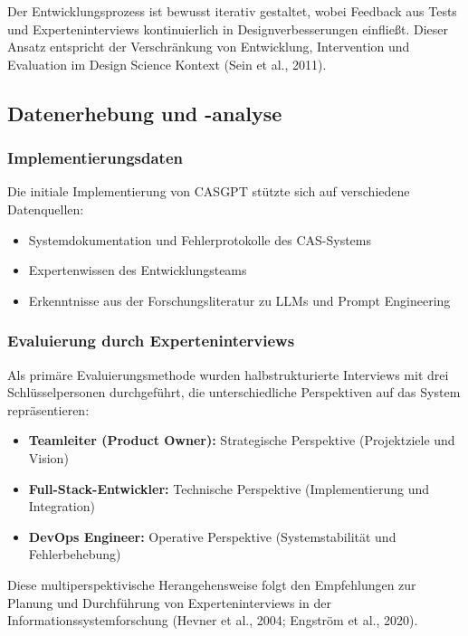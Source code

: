 \documentclass[
  a4paper,
  12pt,
  oneside,
  open=any,
  BCOR=12mm,
  DIV=14,
  parskip=half*,
  headsepline,
  footsepline,
  pointlessnumbers,
  liststotoc,
  numbers=noenddot,
  listof=totoc]{scrartcl}
\providecommand{\tightlist}{%
  \setlength{\itemsep}{0pt}\setlength{\parskip}{0pt}}\usepackage{longtable,booktabs,array}
\begin{document}
Der Entwicklungsprozess ist bewusst iterativ gestaltet, wobei Feedback
aus Tests und Experteninterviews kontinuierlich in Designverbesserungen
einfließt. Dieser Ansatz entspricht der Verschränkung von Entwicklung,
Intervention und Evaluation im Design Science Kontext (Sein et al.,
2011).

\subsection{Datenerhebung und
-analyse}\label{datenerhebung-und--analyse}

\subsubsection{Implementierungsdaten}\label{implementierungsdaten}

Die initiale Implementierung von CASGPT stützte sich auf verschiedene
Datenquellen:

\begin{itemize}
\tightlist
\item
  Systemdokumentation und Fehlerprotokolle des CAS-Systems
\item
  Expertenwissen des Entwicklungsteams
\item
  Erkenntnisse aus der Forschungsliteratur zu LLMs und Prompt
  Engineering
\end{itemize}

\subsubsection{Evaluierung durch
Experteninterviews}\label{evaluierung-durch-experteninterviews}

Als primäre Evaluierungsmethode wurden halbstrukturierte Interviews mit
drei Schlüsselpersonen durchgeführt, die unterschiedliche Perspektiven
auf das System repräsentieren:

\begin{itemize}
\tightlist
\item
  \textbf{Teamleiter (Product Owner):} Strategische Perspektive
  (Projektziele und Vision)
\item
  \textbf{Full-Stack-Entwickler:} Technische Perspektive
  (Implementierung und Integration)
\item
  \textbf{DevOps Engineer:} Operative Perspektive (Systemstabilität und
  Fehlerbehebung)
\end{itemize}

Diese multiperspektivische Herangehensweise folgt den Empfehlungen zur
Planung und Durchführung von Experteninterviews in der
Informationssystemforschung (Hevner et al., 2004; Engström et al.,
2020).
\end{document}
